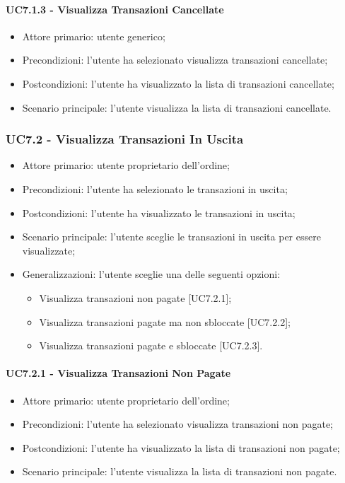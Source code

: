 \paragraph{UC7.1.3 - Visualizza Transazioni Cancellate}

\begin{itemize}
    \item Attore primario: utente generico;
    \item Precondizioni: l'utente ha selezionato visualizza transazioni cancellate;
    \item Postcondizioni: l'utente ha visualizzato la lista di transazioni cancellate;
    \item Scenario principale: l'utente visualizza la lista di transazioni cancellate.
\end{itemize}

\subsubsection{UC7.2 - Visualizza Transazioni In Uscita}

\begin{itemize}
    \item Attore primario: utente proprietario dell'ordine;
    \item Precondizioni: l'utente ha selezionato le transazioni in uscita;
    \item Postcondizioni: l'utente ha visualizzato le transazioni in uscita;
    \item Scenario principale: l'utente sceglie le transazioni in uscita per essere visualizzate;
    \item Generalizzazioni: l'utente sceglie una delle seguenti opzioni:
          \begin{itemize}
              \item Visualizza transazioni non pagate [UC7.2.1];
              \item Visualizza transazioni pagate ma non sbloccate [UC7.2.2];
              \item Visualizza transazioni pagate e sbloccate [UC7.2.3].
          \end{itemize}
\end{itemize}

\paragraph{UC7.2.1 - Visualizza Transazioni Non Pagate}

\begin{itemize}
    \item Attore primario: utente proprietario dell'ordine;
    \item Precondizioni: l'utente ha selezionato visualizza transazioni non pagate;
    \item Postcondizioni: l'utente ha visualizzato la lista di transazioni non pagate;
    \item Scenario principale: l'utente visualizza la lista di transazioni non pagate.
\end{itemize}

